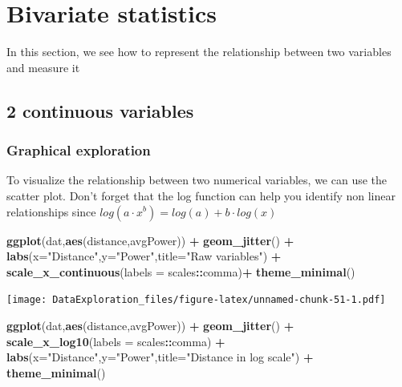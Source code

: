 \documentclass[
]{book}
\newenvironment{Shaded}{\begin{snugshade}}{\end{snugshade}}
\newcommand{\DataTypeTok}[1]{\textcolor[rgb]{0.13,0.29,0.53}{#1}}
\newcommand{\KeywordTok}[1]{\textcolor[rgb]{0.13,0.29,0.53}{\textbf{#1}}}
\newcommand{\NormalTok}[1]{#1}
\newcommand{\OperatorTok}[1]{\textcolor[rgb]{0.81,0.36,0.00}{\textbf{#1}}}
\newcommand{\StringTok}[1]{\textcolor[rgb]{0.31,0.60,0.02}{#1}}
\begin{document}
\hypertarget{bivariate-statistics}{%
\section{Bivariate statistics}\label{bivariate-statistics}}

In this section, we see how to represent the relationship between two variables and measure it

\hypertarget{continuous-variables}{%
\subsection{2 continuous variables}\label{continuous-variables}}

\hypertarget{graphical-exploration}{%
\subsubsection{Graphical exploration}\label{graphical-exploration}}

To visualize the relationship between two numerical variables, we can use the scatter plot. Don't forget that the log function can help you identify non linear relationships since \(log(a \cdot x^b) = log(a) + b \cdot log(x)\)

\begin{Shaded}
\begin{Highlighting}[]
\KeywordTok{ggplot}\NormalTok{(dat,}\KeywordTok{aes}\NormalTok{(distance,avgPower)) }\OperatorTok{+}\StringTok{ }\KeywordTok{geom_jitter}\NormalTok{() }\OperatorTok{+}\StringTok{ }
\StringTok{  }\KeywordTok{labs}\NormalTok{(}\DataTypeTok{x=}\StringTok{"Distance"}\NormalTok{,}\DataTypeTok{y=}\StringTok{"Power"}\NormalTok{,}\DataTypeTok{title=}\StringTok{"Raw variables"}\NormalTok{) }\OperatorTok{+}\StringTok{ }\KeywordTok{scale_x_continuous}\NormalTok{(}\DataTypeTok{labels =}\NormalTok{ scales}\OperatorTok{::}\NormalTok{comma)}\OperatorTok{+}\StringTok{ }\KeywordTok{theme_minimal}\NormalTok{()}
\end{Highlighting}
\end{Shaded}

\texttt{[image: DataExploration\_files/figure-latex/unnamed-chunk-51-1.pdf]}

\begin{Shaded}
\begin{Highlighting}[]
\KeywordTok{ggplot}\NormalTok{(dat,}\KeywordTok{aes}\NormalTok{(distance,avgPower)) }\OperatorTok{+}\StringTok{ }\KeywordTok{geom_jitter}\NormalTok{() }\OperatorTok{+}\StringTok{ }\KeywordTok{scale_x_log10}\NormalTok{(}\DataTypeTok{labels =}\NormalTok{ scales}\OperatorTok{::}\NormalTok{comma) }\OperatorTok{+}\StringTok{ }
\StringTok{  }\KeywordTok{labs}\NormalTok{(}\DataTypeTok{x=}\StringTok{"Distance"}\NormalTok{,}\DataTypeTok{y=}\StringTok{"Power"}\NormalTok{,}\DataTypeTok{title=}\StringTok{"Distance in log scale"}\NormalTok{) }\OperatorTok{+}\StringTok{ }\KeywordTok{theme_minimal}\NormalTok{()}
\end{Highlighting}
\end{Shaded}
\end{document}
